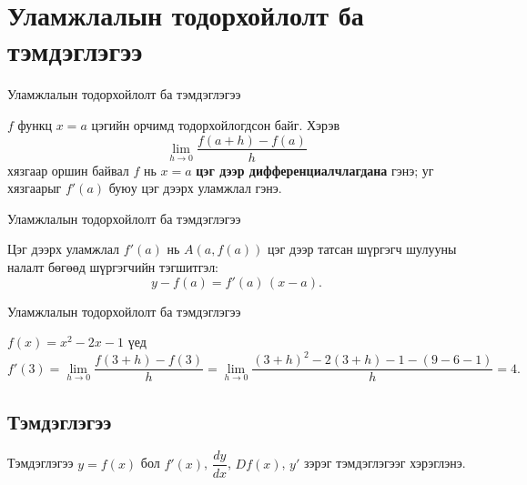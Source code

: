 \section{Уламжлалын тодорхойлолт ба тэмдэглэгээ}
\begin{frame}[allowframebreaks]{Уламжлалын тодорхойлолт ба тэмдэглэгээ}
\begin{definition}
$f$ функц $x=a$ цэгийн орчимд тодорхойлогдсон байг. Хэрэв
\[
\lim_{h\to 0}\frac{f(a+h)-f(a)}{h}
\]
хязгаар оршин байвал $f$ нь $x=a$ \textbf{цэг дээр дифференциалчлагдана} гэнэ; уг хязгаарыг $f'(a)$ буюу цэг дээрх уламжлал гэнэ.
\end{definition}
\end{frame}

\begin{frame}[allowframebreaks]{Уламжлалын тодорхойлолт ба тэмдэглэгээ}
\begin{note}
Цэг дээрх уламжлал $f'(a)$ нь $A(a,f(a))$ цэг дээр татсан шүргэгч шулууны налалт бөгөөд шүргэгчийн тэгшитгэл:
\[
y - f(a) = f'(a)\,(x-a).
\]
\end{note}
\end{frame}

\begin{frame}[allowframebreaks]{Уламжлалын тодорхойлолт ба тэмдэглэгээ}
\begin{example}
$f(x)=x^2-2x-1$ үед
\[
f'(3)=\lim_{h\to 0}\frac{f(3+h)-f(3)}{h}
=\lim_{h\to 0}\frac{(3+h)^2-2(3+h)-1 - (9-6-1)}{h}=4.
\]
\end{example}

\begin{center}
\begin{fitbox}\end{fitbox}
\end{center}
\end{frame}

\subsection*{Тэмдэглэгээ}
\begin{frame}[allowframebreaks]{Тэмдэглэгээ}
$y=f(x)$ бол $f'(x)$, $\dfrac{dy}{dx}$, $Df(x)$, $y'$ зэрэг тэмдэглэгээг хэрэглэнэ.
\end{frame}


